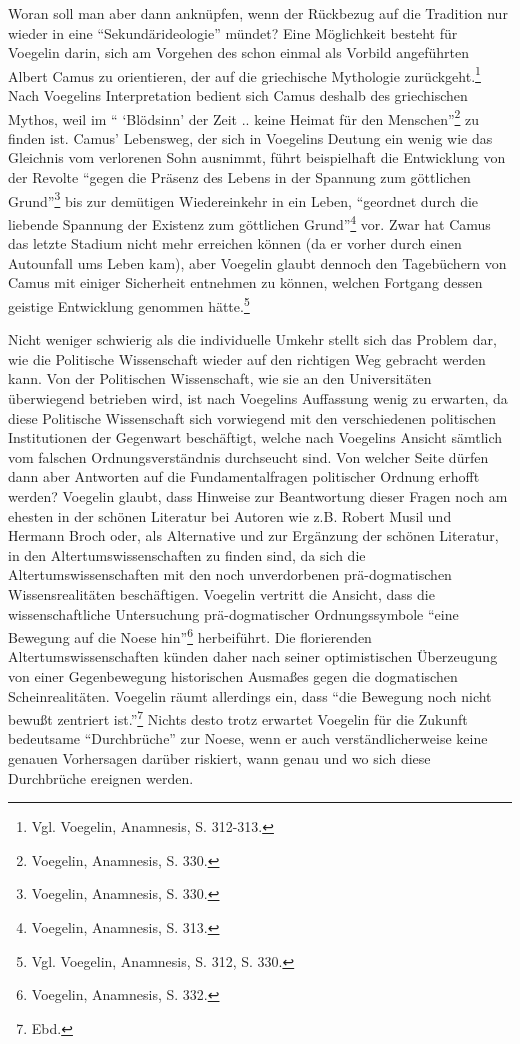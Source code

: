Woran soll man aber dann anknüpfen, wenn der Rückbezug auf die Tradition nur
wieder in eine "`Sekundärideologie"' mündet? Eine Möglichkeit besteht für
Voegelin darin, sich am Vorgehen des schon einmal als Vorbild
angeführten Albert Camus zu orientieren, der auf die griechische Mythologie
zurückgeht.\footnote{Vgl. Voegelin, Anamnesis, S. 312-313.} Nach Voegelins
Interpretation bedient sich Camus deshalb des griechischen Mythos, weil im "`
`Blödsinn' der Zeit .. keine Heimat für den Menschen"'\footnote{Voegelin,
  Anamnesis, S. 330.} zu finden ist. Camus' Lebensweg, der sich in Voegelins
Deutung ein wenig wie das Gleichnis vom verlorenen Sohn ausnimmt, führt
beispielhaft die Entwicklung von der Revolte "`gegen die Präsenz des Lebens in
der Spannung zum göttlichen Grund"'\footnote{Voegelin, Anamnesis, S. 330.} bis
zur demütigen Wiedereinkehr in ein Leben, "`geordnet durch die liebende
Spannung der Existenz zum göttlichen Grund"'\footnote{Voegelin, Anamnesis,
  S. 313.} vor. Zwar hat Camus das letzte Stadium nicht mehr erreichen können
(da er vorher durch einen Autounfall ums Leben kam), aber Voegelin glaubt
dennoch den Tagebüchern von Camus mit einiger Sicherheit entnehmen zu
können, welchen Fortgang dessen geistige Entwicklung genommen
hätte.\footnote{Vgl. Voegelin, Anamnesis, S. 312, S. 330.}

Nicht weniger schwierig als die individuelle Umkehr stellt sich das Problem
dar, wie die Politische Wissenschaft wieder auf den richtigen Weg gebracht
werden kann. Von der Politischen Wissenschaft, wie sie an den Universitäten
überwiegend betrieben wird, ist nach Voegelins Auffassung wenig zu erwarten,
da diese Politische Wissenschaft sich vorwiegend mit den verschiedenen
politischen Institutionen der Gegenwart beschäftigt, welche nach Voegelins
Ansicht sämtlich vom falschen Ordnungsverständnis durchseucht sind. Von
welcher Seite dürfen dann aber Antworten auf die Fundamentalfragen politischer
Ordnung erhofft werden? Voegelin glaubt, dass Hinweise zur Beantwortung dieser
Fragen noch am ehesten in der schönen Literatur bei Autoren wie z.B. Robert
Musil und Hermann Broch oder, als Alternative und zur Ergänzung der schönen
Literatur, in den Altertumswissenschaften zu finden sind, da sich die
Altertumswissenschaften mit den noch unverdorbenen prä-dogmatischen
Wissensrealitäten beschäftigen. Voegelin vertritt die Ansicht, dass die
wissenschaftliche Untersuchung prä-dogmatischer Ordnungssymbole "`eine
Bewegung auf die Noese hin"'\footnote{Voegelin, Anamnesis, S. 332.}
herbeiführt. Die florierenden Altertumswissenschaften künden daher nach seiner
optimistischen Überzeugung von einer Gegenbewegung historischen Ausmaßes gegen
die dogmatischen Scheinrealitäten.  Voegelin räumt allerdings ein, dass "`die
Bewegung noch nicht bewußt zentriert ist."'\footnote{Ebd.} Nichts desto trotz
erwartet Voegelin für die Zukunft bedeutsame "`Durchbrüche"' zur Noese, wenn
er auch verständlicherweise keine genauen Vorhersagen darüber riskiert, wann
genau und wo sich diese Durchbrüche ereignen werden.

